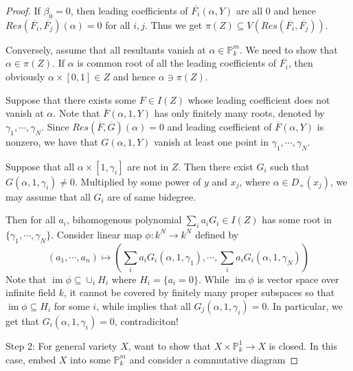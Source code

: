 \documentclass{ctexart}
\newcommand{\im}{\operatorname{im}}
\begin{document}
\begin{proof}
    \par
    If $\beta_{0} = 0$, then leading coefficients of $\overline{F_{i}}(\alpha, Y)$ are all $0$ and hence $Res(\overline{F_{i}}, \overline{F_{j}})(\alpha) = 0$ for all $i,j$. 
    Thus we get $\pi(Z) \subseteq V(Res(\overline{F_{i}}, \overline{F_{j}}))$.
    \par
    Conversely, assume that all resultants vanish at $\alpha\in \mathbb{P}_{k}^{m}$.
    We need to show that $\alpha\in \pi(Z)$.
    If $\alpha$ is common root of all the leading coefficients of $\overline{F_{i}}$,
    then obviously $\alpha \times [0, 1]\in Z$ and hence $\alpha\ni \pi(Z)$.
    \par
    Suppose that there exists some $F\in I(Z)$ whose leading coefficient does not vanish at $\alpha$.
    Note that $\overline{F}(\alpha, 1, Y)$ has only finitely many roots, denoted by $\gamma_{1}, \cdots, \gamma_{N}$.
    Since $Res(\overline{F}, \overline{G})(\alpha) = 0$ and leading coefficient of $\overline{F}(\alpha, Y)$ is nonzero,
    we have that $G(\alpha, 1, Y)$ vanish at least one point in $\gamma_{1}, \cdots, \gamma_{N}$.
    \par
    Suppose that all $\alpha \times [1, \gamma_{i}]$ are not in $Z$.
    Then there exist $G_{i}$ such that $G(\alpha, 1, \gamma_{i}) \neq 0$.
    Multiplied by some power of $y$ and $x_{j}$, where $\alpha\in D_{+}(x_{j})$,
    we may assume that all $G_{i}$ are of same bidegree.
    \par
    Then for all $a_{i}$, bihomogenous polynomial $\sum_{i} a_{i}G_{i}\in I(Z)$ has some root in $\{\gamma_{1}, \cdots, \gamma_{N}\}$.
    Consider linear map $\phi: k^{N} \rightarrow k^{N}$ defined by 
    \begin{equation}
        (a_{1}, \cdots, a_{n}) \longmapsto (\sum_{i} a_{i}G_{i}(\alpha, 1, \gamma_{1}), \cdots, \sum_{i} a_{i}G_{i}(\alpha, 1, \gamma_{N}))
    \end{equation}
    Note that $\im \phi \subseteq \cup_{i} H_{i}$ where $H_{i} = \{a_{i} = 0\}$.
    While $\im \phi$ is vector space over infinite field $k$, 
    it cannot be covered by finitely many proper subspaces so that $\im \phi \subseteq H_{i}$ for some $i$,
    while implies that all $G_{j}(\alpha, 1, \gamma_{i}) = 0$.
    In particular, we get that $G_{i}(\alpha, 1, \gamma_{i}) = 0$, contradiciton!
    \par
    Step 2: For general variety $X$, want to show that $X \times \mathbb{P}_{k}^{1} \rightarrow X$ is closed.
    In this case, embed $X$ into some $\mathbb{P}_{k}^{m}$ and consider a commutative diagram

\end{proof}
\end{document}
